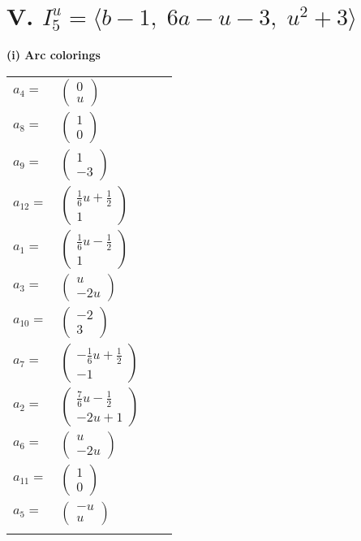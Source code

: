 \documentclass[1p]{elsarticle_modified}
\theoremstyle{definition}
\begin{document}
\centering \section*{V. $I^u_{5}= \langle b-1,\;6 a- u-3,\;u^2+3 \rangle$}
\flushleft \textbf{(i) Arc colorings}\\
\begin{tabular}{m{7pt} m{180pt} m{7pt} m{180pt} }
\flushright $a_{4}=$&$\begin{pmatrix}0\\u\end{pmatrix}$ \\
\flushright $a_{8}=$&$\begin{pmatrix}1\\0\end{pmatrix}$ \\
\flushright $a_{9}=$&$\begin{pmatrix}1\\-3\end{pmatrix}$ \\
\flushright $a_{12}=$&$\begin{pmatrix}\frac{1}{6} u+\frac{1}{2}\\1\end{pmatrix}$ \\
\flushright $a_{1}=$&$\begin{pmatrix}\frac{1}{6} u-\frac{1}{2}\\1\end{pmatrix}$ \\
\flushright $a_{3}=$&$\begin{pmatrix}u\\-2 u\end{pmatrix}$ \\
\flushright $a_{10}=$&$\begin{pmatrix}-2\\3\end{pmatrix}$ \\
\flushright $a_{7}=$&$\begin{pmatrix}-\frac{1}{6} u+\frac{1}{2}\\-1\end{pmatrix}$ \\
\flushright $a_{2}=$&$\begin{pmatrix}\frac{7}{6} u-\frac{1}{2}\\-2 u+1\end{pmatrix}$ \\
\flushright $a_{6}=$&$\begin{pmatrix}u\\-2 u\end{pmatrix}$ \\
\flushright $a_{11}=$&$\begin{pmatrix}1\\0\end{pmatrix}$ \\
\flushright $a_{5}=$&$\begin{pmatrix}- u\\u\end{pmatrix}$\\&\end{tabular}
\end{document}
